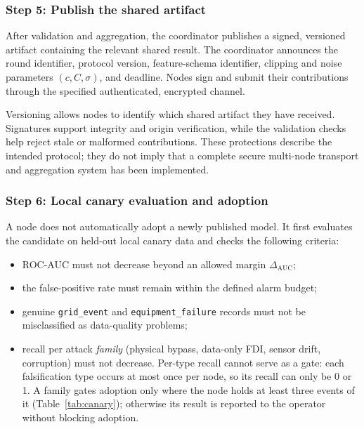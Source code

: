 \documentclass[11pt,a4paper]{article}
\newcommand{\code}[1]{\texttt{#1}}
\begin{document}
\subsubsection{Step 5: Publish the shared artifact}

After validation and aggregation, the coordinator publishes a signed,
versioned artifact containing the relevant shared result. The
coordinator announces the round identifier, protocol version,
feature-schema identifier, clipping and noise parameters $(c,C,\sigma)$,
and deadline. Nodes sign and submit their contributions through the
specified authenticated, encrypted channel.

Versioning allows nodes to identify which shared artifact they have
received. Signatures support integrity and origin verification, while
the validation checks help reject stale or malformed contributions.
These protections describe the intended protocol; they do not imply
that a complete secure multi-node transport and aggregation system
has been implemented.

\subsubsection{Step 6: Local canary evaluation and adoption}

A node does not automatically adopt a newly published model. It first
evaluates the candidate on held-out local canary data and checks the
following criteria:
\begin{itemize}
    \item ROC-AUC must not decrease beyond an allowed margin
    $\Delta_{\mathrm{AUC}}$;
    \item the false-positive rate must remain within the defined alarm
    budget;
    \item genuine \code{grid\_event} and \code{equipment\_failure}
    records must not be misclassified as data-quality problems;
    \item recall per attack \emph{family} (physical bypass, data-only
    FDI, sensor drift, corruption) must not decrease. Per-type recall
    cannot serve as a gate: each falsification type occurs at most once
    per node, so its recall can only be 0 or 1. A family gates adoption
    only where the node holds at least three events of it
    (Table~\ref{tab:canary}); otherwise its result is reported to the
    operator without blocking adoption.
\end{itemize}
\end{document}
